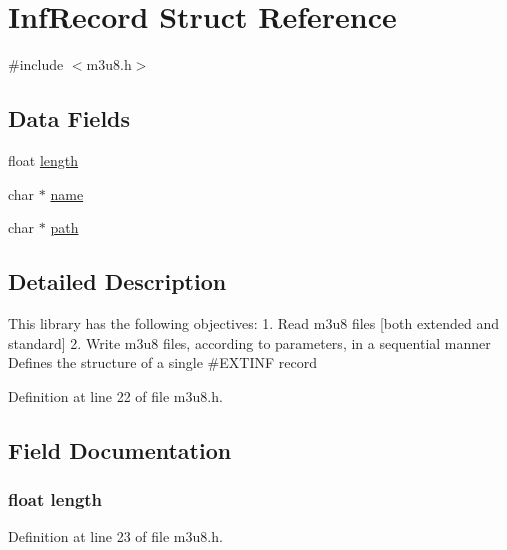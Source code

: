 \hypertarget{struct_inf_record}{\section{\-Inf\-Record \-Struct \-Reference}
\label{struct_inf_record}
}


{\ttfamily \#include $<$m3u8.\-h$>$}

\subsection*{\-Data \-Fields}
\begin{DoxyCompactItemize}
\item 
float \hyperlink{struct_inf_record_a6150639f5295064e97e299a9206d16b1}{length}
\item 
char $\ast$ \hyperlink{struct_inf_record_a5ac083a645d964373f022d03df4849c8}{name}
\item 
char $\ast$ \hyperlink{struct_inf_record_a44196e6a5696d10442c29e639437196e}{path}
\end{DoxyCompactItemize}


\subsection{\-Detailed \-Description}
\-This library has the following objectives\-: 1. \-Read m3u8 files \mbox{[}both extended and standard\mbox{]} 2. \-Write m3u8 files, according to parameters, in a sequential manner \-Defines the structure of a single \#\-E\-X\-T\-I\-N\-F record 

\-Definition at line 22 of file m3u8.\-h.



\subsection{\-Field \-Documentation}
\hypertarget{struct_inf_record_a6150639f5295064e97e299a9206d16b1}{
\subsubsection[{length}]{\setlength{\rightskip}{0pt plus 5cm}float {\bf length}}}\label{struct_inf_record_a6150639f5295064e97e299a9206d16b1}


\-Definition at line 23 of file m3u8.\-h.



